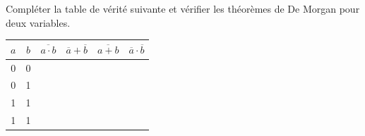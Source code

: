 \documentclass[10pt]{article}
\begin{document}
\begin{exemple}


Compléter la table de vérité suivante et vérifier les théorèmes de De Morgan pour deux variables.
\begin{center}
\begin{tabular}[c]{|c|c||c|c|c|c|}
\hline
$a$ & $b$ & $\overline{a\cdot b}$ & $\overline{a} + \overline{b}$ & $\overline{a+b}$ & $\overline{a}\cdot\overline{b}$ \\
\hline \hline 
0 & 0 & & & & \\ \hline
0 & 1 & & & & \\ \hline
1 & 1 & & & & \\ \hline
1 & 1 & & & & \\ \hline
\end{tabular}
\end{center}

\end{exemple}
\end{document}
